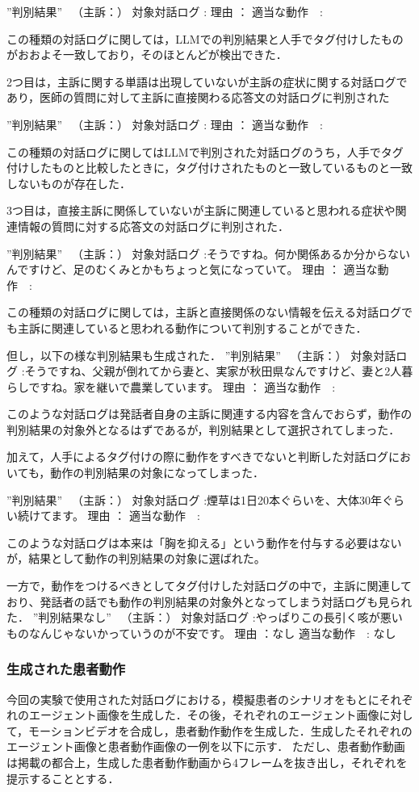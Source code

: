 ”判別結果” 　（主訴：）
  対象対話ログ  :
         理由  ：
    適当な動作　:

この種類の対話ログに関しては，LLMでの判別結果と人手でタグ付けしたものがおおよそ一致しており，そのほとんどが検出できた．

2つ目は，主訴に関する単語は出現していないが主訴の症状に関する対話ログであり，医師の質問に対して主訴に直接関わる応答文の対話ログに判別された

”判別結果” 　（主訴：）
  対象対話ログ  :
         理由  ：
    適当な動作　:

この種類の対話ログに関してはLLMで判別された対話ログのうち，人手でタグ付けしたものと比較したときに，タグ付けされたものと一致しているものと一致しないものが存在した．

3つ目は，直接主訴に関係していないが主訴に関連していると思われる症状や関連情報の質問に対する応答文の対話ログに判別された．

”判別結果” 　（主訴：）
  対象対話ログ  :そうですね。何か関係あるか分からないんですけど、足のむくみとかもちょっと気になっていて。
         理由  ：
    適当な動作　:

この種類の対話ログに関しては，主訴と直接関係のない情報を伝える対話ログでも主訴に関連していると思われる動作について判別することができた．

但し，以下の様な判別結果も生成された．
”判別結果” 　（主訴：）
  対象対話ログ  :そうですね、父親が倒れてから妻と、実家が秋田県なんですけど、妻と2人暮らしですね。家を継いで農業しています。
         理由  ：
    適当な動作　:

このような対話ログは発話者自身の主訴に関連する内容を含んでおらず，動作の判別結果の対象外となるはずであるが，判別結果として選択されてしまった．

加えて，人手によるタグ付けの際に動作をすべきでないと判断した対話ログにおいても，動作の判別結果の対象になってしまった．

”判別結果” 　（主訴：）
  対象対話ログ  :煙草は1日20本ぐらいを、大体30年ぐらい続けてます。
         理由  ：
    適当な動作　:

このような対話ログは本来は「胸を抑える」という動作を付与する必要はないが，結果として動作の判別結果の対象に選ばれた。
    
一方で，動作をつけるべきとしてタグ付けした対話ログの中で，主訴に関連しており、発話者の話でも動作の判別結果の対象外となってしまう対話ログも見られた．
”判別結果なし” 　（主訴：）
  対象対話ログ  :やっぱりこの長引く咳が悪いものなんじゃないかっていうのが不安です。
         理由  ：なし
    適当な動作　: なし

\subsubsection*{生成された患者動作}
今回の実験で使用された対話ログにおける，模擬患者のシナリオをもとにそれぞれのエージェント画像を生成した．その後，それぞれのエージェント画像に対して，モーションビデオを合成し，患者動作動作を生成した．生成したそれぞれのエージェント画像と患者動作画像の一例を以下に示す．
ただし、患者動作動画は掲載の都合上，生成した患者動作動画から4フレームを抜き出し，それぞれを提示することとする．
